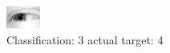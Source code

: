 \begin{figure}[h!]
\begin{center}
\includegraphics[width=0.60\columnwidth]{figures/ID2538_class_3_target_4.png}
\end{center}
\caption{ Classification: 3 actual target: 4}
\label{fig:ID2538_class_3_target_4}
\end{figure}
